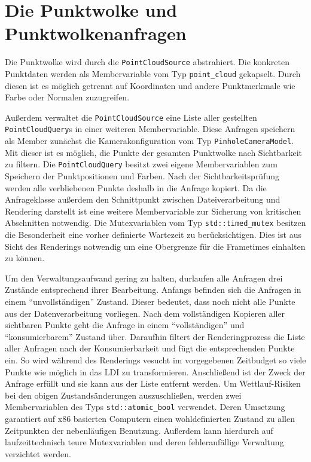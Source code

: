 \documentclass[hyperref, beleg, german]{cgvpub}
\begin{document}
\section{Die Punktwolke und Punktwolkenanfragen}

Die Punktwolke wird durch die \texttt{PointCloudSource} abstrahiert. Die
konkreten Punktdaten werden als Membervariable vom Typ \texttt{point\_cloud}
gekapselt. Durch diesen ist es möglich getrennt auf Koordinaten und andere
Punktmerkmale wie Farbe oder Normalen zuzugreifen.

Außerdem verwaltet die \texttt{PointCloudSource} eine Liste aller gestellten
\texttt{PointCloudQuery}s in einer weiteren Membervariable. Diese Anfragen
speichern als Member zunächst die Kamerakonfiguration vom Typ
\texttt{PinholeCameraModel}. Mit dieser ist es möglich, die Punkte der gesamten
Punktwolke nach Sichtbarkeit zu filtern. Die \texttt{PointCloudQuery} besitzt
zwei eigene Membervariablen zum Speichern der Punktpositionen und Farben. Nach
der Sichtbarkeitsprüfung werden alle verbliebenen Punkte deshalb in die Anfrage
kopiert. Da die Anfrageklasse außerdem den Schnittpunkt zwischen
Dateiverarbeitung und Rendering darstellt ist eine weitere Membervariable zur
Sicherung von kritischen Abschnitten notwendig. Die Mutexvariablen vom Typ
\texttt{std::timed\_mutex} besitzen die Besonderheit eine vorher definierte
Wartezeit zu berücksichtigen. Dies ist aus Sicht des Renderings notwendig um
eine Obergrenze für die Frametimes einhalten zu können. 

Um den Verwaltungsaufwand gering zu halten, durlaufen alle Anfragen drei
Zustände entsprechend ihrer Bearbeitung. Anfangs befinden sich die Anfragen in
einem ``unvollständigen'' Zustand. Dieser bedeutet, dass noch nicht alle Punkte
aus der Datenverarbeitung vorliegen. Nach dem vollständigen Kopieren aller
sichtbaren Punkte geht die Anfrage in einem ``vollständigen'' und
``konsumierbarem'' Zustand über. Daraufhin filtert der Renderingprozess die
Liste aller Anfragen nach der Konsumierbarkeit und fügt die entsprechenden
Punkte ein. So wird während des Renderings vesucht im vorgegebenen Zeitbudget
so viele Punkte wie möglich in das LDI zu transformieren. Anschließend ist der
Zweck der Anfrage erfüllt und sie kann aus der Liste entfernt werden. Um
Wettlauf-Risiken bei den obigen Zustandsänderungen auszuschließen, werden zwei
Membervariablen des Typs \texttt{std::atomic\_bool} verwendet. Deren Umsetzung
garantiert auf x86 basierten Computern einen wohldefinierten Zustand zu allen
Zeitpunkten der nebenläufigen Benutzung. Außerdem kann hierdurch auf
laufzeittechnisch teure Mutexvariablen und deren fehleranfällige Verwaltung
verzichtet werden.
\end{document}
